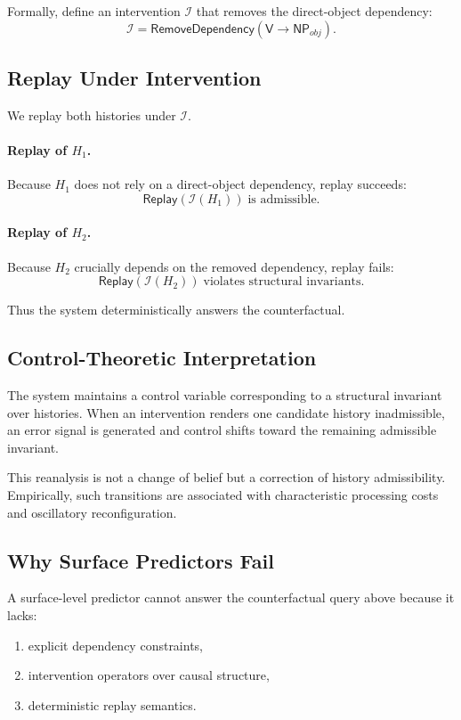 \documentclass[11pt]{article}
\begin{document}
Formally, define an intervention $\mathcal{I}$ that removes the direct-object dependency:
\[
\mathcal{I} = \mathsf{RemoveDependency}(\mathsf{V} \rightarrow \mathsf{NP}_{obj}).
\]

\subsection{Replay Under Intervention}

We replay both histories under $\mathcal{I}$.

\paragraph{Replay of $H_1$.}
Because $H_1$ does not rely on a direct-object dependency, replay succeeds:
\[
\mathsf{Replay}(\mathcal{I}(H_1)) \;\text{is admissible}.
\]

\paragraph{Replay of $H_2$.}
Because $H_2$ crucially depends on the removed dependency, replay fails:
\[
\mathsf{Replay}(\mathcal{I}(H_2)) \;\text{violates structural invariants}.
\]

Thus the system deterministically answers the counterfactual.

\subsection{Control-Theoretic Interpretation}

The system maintains a control variable corresponding to a structural invariant over histories. When an intervention renders one candidate history inadmissible, an error signal is generated and control shifts toward the remaining admissible invariant.

This reanalysis is not a change of belief but a correction of history admissibility. Empirically, such transitions are associated with characteristic processing costs and oscillatory reconfiguration.

\subsection{Why Surface Predictors Fail}

A surface-level predictor cannot answer the counterfactual query above because it lacks:
\begin{enumerate}
  \item explicit dependency constraints,
  \item intervention operators over causal structure,
  \item deterministic replay semantics.
\end{enumerate}
\end{document}
